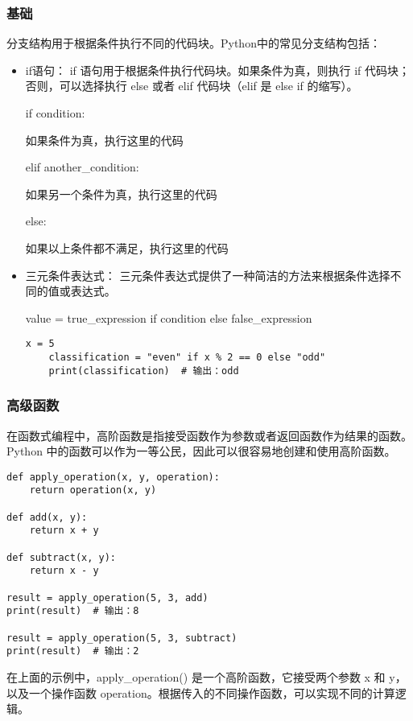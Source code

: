 \documentclass{article}
\begin{document}
 \subsubsection{基础}
 分支结构用于根据条件执行不同的代码块。Python中的常见分支结构包括：
 \begin{itemize}
    \item if语句： if 语句用于根据条件执行代码块。如果条件为真，则执行 if 代码块；否则，可以选择执行 else 或者 elif 代码块（elif 是 else if 的缩写）。
    \par if condition:
    \par 如果条件为真，执行这里的代码
    \par elif another\_condition:
    \par 如果另一个条件为真，执行这里的代码
    \par  else:
    \par 如果以上条件都不满足，执行这里的代码
    
\item  三元条件表达式： 三元条件表达式提供了一种简洁的方法来根据条件选择不同的值或表达式。
    \par value = true\_expression if condition else false\_expression
    \begin{lstlisting}[caption={示例Python代码}]
    x = 5
    classification = "even" if x % 2 == 0 else "odd"
    print(classification)  # 输出：odd
    \end{lstlisting}
\end{itemize}

\subsubsection{ 高级函数}
在函数式编程中，高阶函数是指接受函数作为参数或者返回函数作为结果的函数。Python 中的函数可以作为一等公民，因此可以很容易地创建和使用高阶函数。
\begin{lstlisting}[caption={示例Python代码}]
def apply_operation(x, y, operation):
    return operation(x, y)

def add(x, y):
    return x + y

def subtract(x, y):
    return x - y

result = apply_operation(5, 3, add)
print(result)  # 输出：8

result = apply_operation(5, 3, subtract)
print(result)  # 输出：2
\end{lstlisting}
在上面的示例中，apply\_operation() 是一个高阶函数，它接受两个参数 x 和 y，以及一个操作函数 operation。根据传入的不同操作函数，可以实现不同的计算逻辑。
\end{document}
